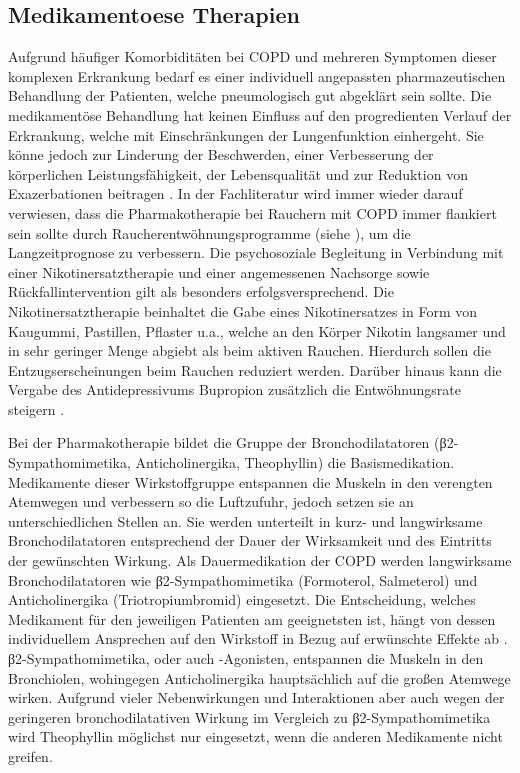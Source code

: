 \subsection{Medikamentoese Therapien}
\label{medikamentoese therapien}
Aufgrund häufiger Komorbiditäten bei COPD und mehreren Symptomen dieser komplexen Erkrankung bedarf es einer individuell angepassten pharmazeutischen Behandlung der Patienten, welche pneumologisch gut abgeklärt sein sollte. Die medikamentöse Behandlung hat keinen Einfluss auf den progredienten Verlauf der Erkrankung, welche mit Einschränkungen der Lungenfunktion einhergeht. Sie könne jedoch zur Linderung der Beschwerden, einer Verbesserung der körperlichen Leistungsfähigkeit, der Lebensqualität und zur Reduktion von Exazerbationen beitragen \autocite[vgl.][249]{gillissen2007}. In der Fachliteratur wird immer wieder darauf verwiesen, dass die Pharmakotherapie bei Rauchern mit COPD immer flankiert sein sollte durch Raucherentwöhnungsprogramme (siehe \label{nicht-medikamentoese therapien}), um die Langzeitprognose zu verbessern. Die psychosoziale Begleitung in Verbindung mit einer Nikotinersatztherapie und einer angemessenen Nachsorge sowie Rückfallintervention gilt als besonders erfolgsversprechend. Die Nikotinersatztherapie beinhaltet die Gabe eines Nikotinersatzes in Form von Kaugummi, Pastillen, Pflaster u.a., welche an den Körper Nikotin langsamer und in sehr geringer Menge abgiebt als beim aktiven Rauchen. Hierdurch sollen die Entzugserscheinungen beim Rauchen reduziert werden. Darüber hinaus kann die Vergabe des Antidepressivums Bupropion zusätzlich die Entwöhnungsrate steigern \autocite[vgl.][e12]{vogelmeier2007}.

Bei der Pharmakotherapie bildet die Gruppe der Bronchodilatatoren (β2-Sympathomimetika, Anticholinergika, Theophyllin) die Basismedikation. Medikamente dieser Wirkstoffgruppe entspannen die Muskeln in den verengten Atemwegen und verbessern so die Luftzufuhr, jedoch setzen sie an unterschiedlichen Stellen an. Sie werden unterteilt in kurz- und langwirksame Bronchodilatatoren entsprechend der Dauer der Wirksamkeit und des Eintritts der gewünschten Wirkung. Als Dauermedikation der COPD werden langwirksame Bronchodilatatoren wie β2-Sympathomimetika (Formoterol, Salmeterol) und Anticholinergika (Triotropiumbromid) eingesetzt. Die Entscheidung, welches Medikament für den jeweiligen Patienten am geeignetsten ist, hängt von dessen individuellem Ansprechen auf den Wirkstoff in Bezug auf erwünschte Effekte ab \autocite[vgl.][e13]{vogelmeier2007}. β2-Sympathomimetika, oder auch -Agonisten, entspannen die Muskeln in den Bronchiolen, wohingegen Anticholinergika hauptsächlich auf die großen Atemwege wirken. Aufgrund vieler Nebenwirkungen und Interaktionen aber auch wegen der geringeren bronchodilatativen Wirkung im Vergleich zu β2-Sympathomimetika wird Theophyllin möglichst nur eingesetzt, wenn die anderen Medikamente nicht greifen. 



